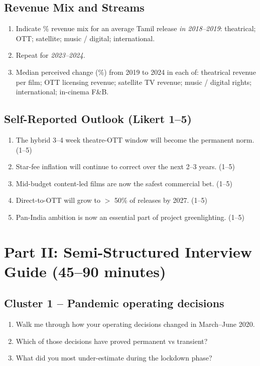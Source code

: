 \subsection*{Revenue Mix and Streams}
\begin{enumerate}[resume,itemsep=2pt]
  \item Indicate \% revenue mix for an average Tamil release
        \emph{in 2018--2019}: theatrical; OTT; satellite; music /
        digital; international.
  \item Repeat for \emph{2023--2024}.
  \item Median perceived change (\%) from 2019 to 2024 in each of:
        theatrical revenue per film; OTT licensing revenue;
        satellite TV revenue; music / digital rights; international;
        in-cinema F\&B.
\end{enumerate}

\subsection*{Self-Reported Outlook (Likert 1--5)}
\begin{enumerate}[resume,itemsep=2pt]
  \item The hybrid 3--4 week theatre-OTT window will become the
        permanent norm. (1--5)
  \item Star-fee inflation will continue to correct over the next
        2--3 years. (1--5)
  \item Mid-budget content-led films are now the safest commercial
        bet. (1--5)
  \item Direct-to-OTT will grow to $>$ 50\% of releases by 2027.
        (1--5)
  \item Pan-India ambition is now an essential part of project
        greenlighting. (1--5)
\end{enumerate}

\section*{Part II: Semi-Structured Interview Guide (45--90 minutes)}

\subsection*{Cluster 1 -- Pandemic operating decisions}
\begin{enumerate}[itemsep=2pt]
\item Walk me through how your operating decisions changed in
      March--June 2020.
\item Which of those decisions have proved permanent vs transient?
\item What did you most under-estimate during the lockdown phase?
\end{enumerate}

